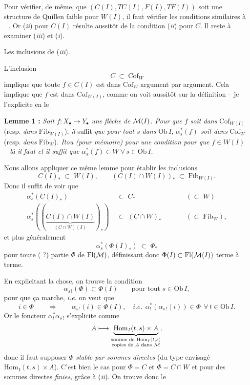 Pour vérifier, de même, que $(C(I),TC(I),F(I),TF(I))$ soit une structure de Quillen faible pour $W(I)$, il faut vérifier les conditions similaires à \,\, . Or (\textit{ii}) pour $C(I)$ résulte aussitôt de la condition (\textit{ii}) pour $C$. Il reste à examiner (\textit{iii}) et (\textit{i}).

Les inclusions de (\textit{iii}).

L'inclusion
\[
C\;\subset\;\mathrm{Cof}_W
\]
implique que toute $f\in C(I)$ est dans $\mathrm{Cof}_W$ argument par argument. Cela implique que $f$ est dans $\mathrm{Cof}_{W(I)}$, comme on voit aussitôt sur la définition – je l'explicite en le

\textbf{Lemme 1 :} \textit{Soit $f : X_\bullet\longrightarrow Y_\bullet$ une flèche de $\mathcal{M}(I)$. Pour que $f$ soit dans} $\mathrm{Cof}_{W(I)}$ (resp. \textit{dans} $\mathrm{Fib}_{W(I)}$), \textit{il} suffit \textit{que pour tout $s$ dans} $\mathrm{Ob}\,I$, \textit{$\alpha_s^*(f)$ soit dans} $\mathrm{Cof}_W$ (resp. \textit{dans} $\mathrm{Fib}_W$)\textit{. Itou (pour mémoire) pour une condition pour que $f\in W(I)$ – là il faut et il suffit que $\alpha_s^*(f)\in W\ \forall\, s\in\mathrm{Ob}\,I$.}

Nous allons appliquer ce même lemme pour établir les inclusions
\[
C(I)_* \;\subset\; W(I), \qquad (C(I)\cap W(I))_* \;\subset\; \mathrm{Fib}_{W(I)}.
\]
Donc il suffit de voir que
\[
\begin{aligned}
\alpha_s^*(C(I)_*) \;&\subset\; C_* &&\qquad (\subset\; W)\\
\alpha_s^*((\underbrace{C(I)\cap W(I)}_{(C\cap W)(I)})_*) \;&\subset\; (C\cap W)_* &&\qquad (\subset\; \mathrm{Fib}_W),
\end{aligned}
\]
et plus généralement
\[
\alpha_s^*(\Phi(I)_*) \;\subset\; \Phi_* \tag*{(7)}
\]
pour toute ( ?) partie $\Phi$ de $\mathrm{Fl}(\mathcal{M})$, définissant donc $\Phi(I)\subset\mathrm{Fl}(\mathcal{M}(I))$ terme à terme.

En explicitant la chose, on trouve la condition
\[
\alpha_{s\,!}(\Phi)\subset\Phi(I) \qquad \text{pour tout } s\in\mathrm{Ob}\,I,
\]
pour que ça marche, \textit{i.e.} on veut que
\[
i\in\Phi \qquad\Longrightarrow\qquad \alpha_{s\,!}(i)\in\Phi(I), \quad \textit{i.e.}\ \ \alpha_t^*(\alpha_{s\,!}(i))\in\Phi\ \ \forall\, t\in\mathrm{Ob}\,I.
\]
Or le foncteur $\alpha_t^*\alpha_{s\,!}$ s'explicite comme
\[
A \longmapsto \underbrace{\mathrm{Hom}_I(t,s)\times A}_{\substack{\text{somme de } \mathrm{Hom}_I(t,s)\\ \text{copies de } A \text{ dans } \mathcal{M}}},
\]
donc il faut supposer $\Phi$ \textit{stable par sommes directes} (du type envisagé $\mathrm{Hom}_I(t,s)\times A$). C'est bien le cas pour $\Phi = C$ et $\Phi = C\cap W$ et pour des sommes directes \textit{finies,} grâce à (\textit{ii}). On trouve donc le

